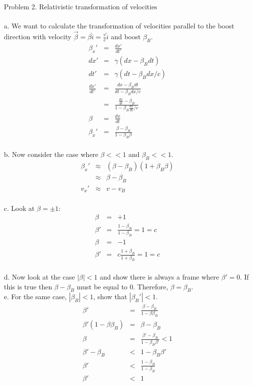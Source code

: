 \documentclass[11pt]{amsart}
\begin{document}
Problem 2. Relativistic transformation of velocities \\ \\
a. We want to calculate the transformation of velocities parallel to the boost direction with velocity  $\vec{\beta}=\beta\hat{i}=\frac{v}{c}\hat{i}$ and boost $\beta_{B}$.\\
\begin{eqnarray*}
\beta_{x}' &=& \frac{dx'}{dt'} \\
dx' &=& \gamma(dx-\beta_{B}dt) \\
dt' &=& \gamma(dt-\beta_{B}dx/c) \\
\frac{dx'}{dt'} &=& \frac{dx-\beta_{B}dt}{dt-\beta_{B}dx/c} \\
&=& \frac{\frac{dx}{dt}-\beta_{B}}{1-\beta_{B}\frac{dx}{dt}/c} \\
\beta &=& \frac{dx}{dt} \\
\beta_{x}' &=& \frac{\beta-\beta_{B}}{1-\beta_{B}\beta} 
\end{eqnarray*} \\
b. Now consider the case where $\beta<<1$ and $\beta_{B}<<1$. \\
\begin{eqnarray*}
\beta_{x}' &\approx& (\beta-\beta_{B})(1+\beta_{B}\beta) \\
&\approx& \beta-\beta_{B} \\
v_{x}' &\approx& v-v_{B} 
\end{eqnarray*} \\
c. Look at $\beta=\pm{1}$: \\
\begin{eqnarray*}
\beta &=& +1 \\
\beta' &=& \frac{1-\beta_{B}}{1-\beta_{B}} = 1 = c\\
\beta &=& -1 \\
\beta' &=&c\frac{1+\beta_{B}}{1+\beta_{B}} = 1 = c 
\end{eqnarray*} \\
d. Now look at the case $|\beta|<1$ and show there is always a frame where $\beta'=0$. If this is true then $\beta-\beta_{B}$ must be equal to 0. Therefore, $\beta=\beta_{B}$. \\
e. For the same case, $|\beta_{B}|<1$, show that $|\beta_{B}'|<1$. \\
\begin{eqnarray*} 
\beta' &=& \frac{\beta-\beta_{B}}{1-\beta\beta_{B}} \\
\beta'(1-\beta\beta_{B}) &=& \beta-\beta_{B} \\
\beta &=& \frac{\beta'-\beta_{B}}{1-\beta_{B}\beta'} < 1 \\
\beta'-\beta_{B} &<& 1-\beta_{B}\beta' \\
\beta' &<& \frac{1-\beta_{B}}{1-\beta_{B}} \\
\beta' &<& 1 
\end{eqnarray*} \\
\end{document}
